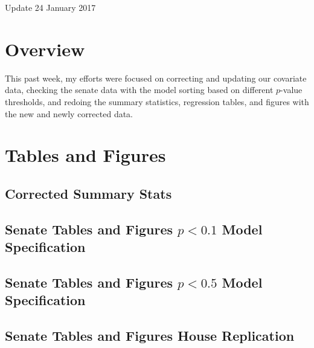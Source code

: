 \documentclass[12pt]{article}
\begin{document}
	

\begin{center}
	Update 24 January 2017
\end{center}


\section{Overview}

This past week, my efforts were focused on correcting and updating our covariate data, checking the senate data with the model sorting based on different $p$-value thresholds, and redoing the summary statistics, regression tables, and figures with the new and newly corrected data.



\section{Tables and Figures}

\subsection{Corrected Summary Stats}

\subsection{Senate Tables and Figures $p < 0.1$ Model Specification}

\subsection{Senate Tables and Figures $p < 0.5$ Model Specification}

\subsection{Senate Tables and Figures House Replication}













	
	
\end{document}
